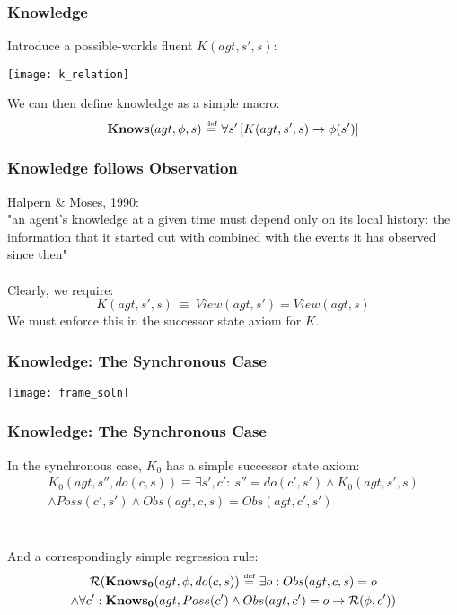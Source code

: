 \documentclass{beamer}
\newcommand{\isdef}{\hbox{$\stackrel{\mbox{\tiny def}}{=}$}}
\newcommand{\Reg}{\mathcal{R}}
\newcommand{\KnowsZ}{\mathbf{Knows_{0}}}
\begin{document}
\begin{frame}
\frametitle{Knowledge}
Introduce a possible-worlds fluent $K(agt,s',s)$:

\begin{center}
  \texttt{[image: k\_relation]}
\end{center}

We can then define knowledge as a simple macro:
\[ \mathbf{Knows}(agt,\phi,s)\ \isdef\ \forall s'\left[K(agt,s',s)\rightarrow \phi(s')\right] \]
\end{frame}

\begin{frame}
\frametitle{Knowledge follows Observation}
Halpern \& Moses, 1990:\\
"an agent's knowledge at a given time must depend only on its local history:
the information that it started out with combined with the events it has
observed since then"
\pause
\ \\
\ \\
Clearly, we require:
\begin{equation*}
K(agt,s',s)\ \equiv\ View(agt,s') = View(agt,s)
\end{equation*}
We must enforce this in the successor state axiom for $K$.
\end{frame}

\begin{frame}
\frametitle{Knowledge: The Synchronous Case}
\begin{center}
  \texttt{[image: frame\_soln]}
\end{center}
\end{frame}

\begin{frame}
\frametitle{Knowledge: The Synchronous Case}
In the synchronous case, $K_0$ has a simple successor state axiom:
\begin{multline*}
 K_0(agt,s'',do(c,s)) \equiv \exists s',c':\ s''=do(c',s') \wedge K_0(agt,s',s)\\
  \wedge Poss(c',s') \wedge Obs(agt,c,s) = Obs(agt,c',s')
\end{multline*}
\ \\
\ \\
\pause
And a correspondingly simple regression rule:
\begin{multline*}
 \Reg(\KnowsZ(agt,\phi,do(c,s))\ \isdef\ \exists o: Obs(agt,c,s)=o\\
  \wedge \forall c': \KnowsZ(agt,Poss(c')\wedge Obs(agt,c')=o \rightarrow \Reg(\phi,c'))
\end{multline*}
\end{frame}
\end{document}
